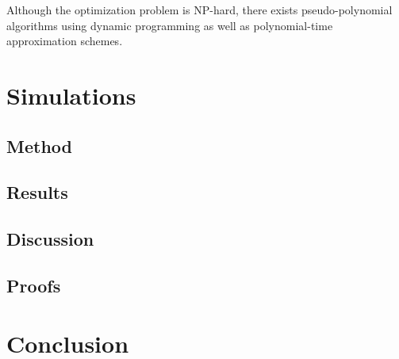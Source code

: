 \documentclass{article}
\begin{document}
Although the optimization problem is NP-hard, there exists pseudo-polynomial algorithms using dynamic programming 
as well as polynomial-time approximation schemes. 

\section{Simulations}
\subsection{Method}
\subsection{Results}
\subsection{Discussion}
\subsection{Proofs}

\section{Conclusion}



\end{document}
